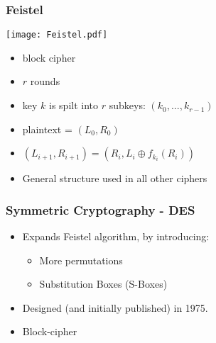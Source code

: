 \documentclass[
hyperref={pdfpagelabels=false}
,xcolor=table
]
{beamer}
\begin{document}
\begin{frame}
  \frametitle{Feistel}
  \begin{minipage}{.35\linewidth}
    \texttt{[image: Feistel.pdf]}
  \end{minipage}
  \begin{minipage}{.55\linewidth}
    \begin{itemize}
    \item block cipher
    \item $r$ rounds
    \item key $k$ is spilt into $r$ subkeys: $(k_0, ..., k_{r-1})$
    \item plaintext = $(L_0, R_0)$
    \item $(L_{i+1}, R_{i+1}) = (R_i, L_i \oplus f_{k_i}(R_i))$
    \item General structure used in all other ciphers
    \end{itemize}
  \end{minipage}
\end{frame}


\begin{frame}
  \frametitle{Symmetric Cryptography - DES}

  \begin{itemize}
  \item Expands Feistel algorithm, by introducing: 
    \begin{itemize}
    \item More permutations
    \item Substitution Boxes (S-Boxes)
    \end{itemize}
  \item Designed (and initially published) in 1975.
  \item Block-cipher
  \end{itemize}

\end{frame}




  

\end{document}
